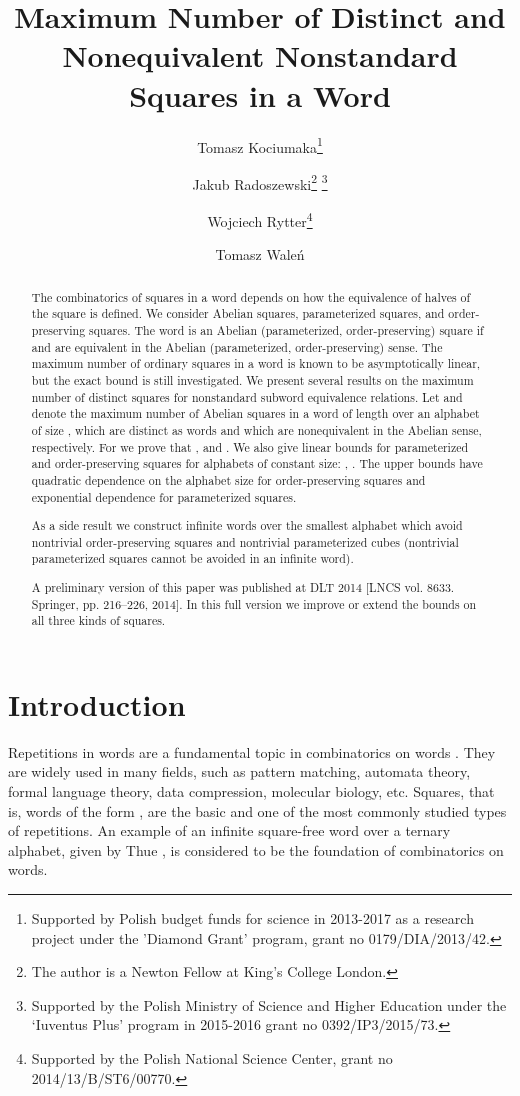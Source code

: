 \documentclass{article}
\title{Maximum Number of Distinct and Nonequivalent Nonstandard Squares in a Word}
\author{Tomasz Kociumaka\footnote{Supported by Polish budget funds for science in 2013-2017 as a research project under the 'Diamond Grant' program,
  grant no 0179/DIA/2013/42.}}
\author{Jakub Radoszewski\footnote{The author is a Newton Fellow at King's College London.} \footnote{Supported by the Polish Ministry of Science and Higher Education under the `Iuventus Plus' program in 2015-2016 grant no 0392/IP3/2015/73.}}
\author{Wojciech Rytter\footnote{Supported by the Polish National Science Center, grant no 2014/13/B/ST6/00770.}}
\author{Tomasz Waleń}
\affil{Institute of Informatics, University of Warsaw\\
\texttt{[kociumaka,jrad,rytter,walen]@mimuw.edu.pl}}
\date{}
\theoremstyle{plain}
\theoremstyle{definition}
\theoremstyle{remark}
\begin{document}
\maketitle


\begin{abstract}
  The combinatorics of squares in a word depends on how the equivalence of halves of the square is defined.
  We consider Abelian squares, parameterized squares, and order-preserving squares.
  The word  is an Abelian (parameterized, order-preserving) square if  and  are
  equivalent in the Abelian (parameterized, order-preserving) sense.
  The maximum number of ordinary squares in a word is known to be
  asymptotically linear, but the exact bound is still investigated.
  We present several results on the maximum number of distinct squares
  for nonstandard subword equivalence relations.
  Let  and  denote the maximum number of Abelian
  squares in a word of length  over an alphabet of size ,
  which are distinct as words and which are nonequivalent in the Abelian sense, respectively.
  For  we prove that , 
  and .
  We also give linear bounds for parameterized and order-preserving squares
  for alphabets of constant size: , .
  The upper bounds have quadratic dependence on the alphabet size for order-preserving
  squares and exponential dependence for parameterized squares. 
  
  As a side result we construct infinite words over the smallest alphabet
  which avoid nontrivial order-preserving squares and nontrivial parameterized cubes
  (nontrivial parameterized squares cannot be avoided in an infinite word).

  A preliminary version of this paper was published at DLT 2014 [LNCS vol. 8633. Springer, pp. 216--226, 2014].
  In this full version we improve or extend the bounds on all three kinds of squares.
\end{abstract}


\section{Introduction}
  Repetitions in words are a fundamental topic in combinatorics on words \cite{Karhumaki}.
  They are widely used in many fields, such as pattern matching, automata theory,
  formal language theory, data compression, molecular biology, etc.
  Squares, that is, words of the form , are the basic and one of the most commonly studied types of repetitions.
  An example of an infinite square-free word over a ternary alphabet, given by Thue \cite{Thue},
  is considered to be the foundation of combinatorics on words.
\end{document}
